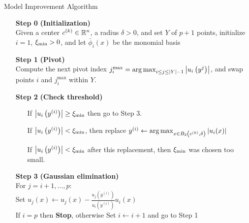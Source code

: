 \begin{algorithm}[H]
    \caption{Model Improvement Algorithm \label{alg:model_improvement} }
    \label{model_improving_algorithm}
    \begin{itemize}
        \item[\textbf{Step 0}] \textbf{(Initialization)} \\
            Given a center $c^{(k)}\in\mathbb R^n$, a radius $\delta >0$, and set $Y$ of $p+1$ points,
            initialize $i=1$, $\xi_{\text{min}} > 0$, and let $\bar \phi_i(x)$ be the monomial basis
		\item[\textbf{Step 1}] \textbf{(Pivot)} \\
			Compute the next pivot index $j^{\textrm{max}}_i = \operatorname*{arg\,max}_{i \le j \le |Y|-1} \left|u_i\left(y^j\right)\right|$,
			and swap points $i$ and $j^{\textrm{max}}_i$ within $Y$.
			
        \item[\textbf{Step 2}] \textbf{(Check threshold)} \begin{itemize}
                \item[] If $\left|u_i\left(y^{(i)}\right)\right| \ge \xi_{\text{min}}$ then go to Step 3.
                \item[] If $\left|u_i\left(y^{(i)}\right)\right| < \xi_{\text{min}}$, then replace $y^{(i)} \gets \operatorname*{arg\,max}_{x \in B_2\left(c^{(k)}, \delta\right)}\left|u_i(x)\right|$
				\item[] If $\left|u_i\left(y^{(i)}\right)\right| < \xi_{\text{min}}$ after this replacement, then $\xi_{\text{min}}$ was chosen too small.
            \end{itemize}
        \item[\textbf{Step 3}] \textbf{(Gaussian elimination)} \\
        	For $j = i+1, \ldots, p$: \\
        	Set $u_j(x) \gets u_j(x) - \frac{u_j\left(y^{(i)}\right)}{u_i\left(y^{(i)}\right)} u_i(x)$ \\
            If $i = p$ then \textbf{Stop}, otherwise Set $i \gets i+1$ and go to Step 1
    \end{itemize}
\end{algorithm}

